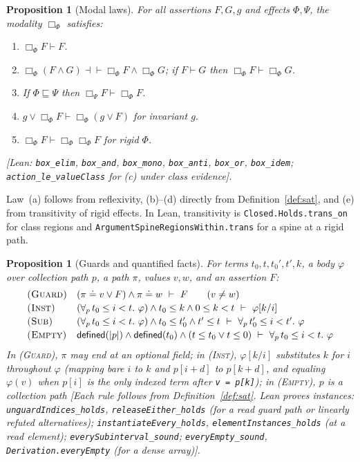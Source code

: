 \documentclass[10pt,a4paper]{article}
\newtheorem{proposition}[theorem]{Proposition}
\theoremstyle{definition}
\theoremstyle{remark}
\newcommand{\bx}[1]{\Box_{#1}}
\newcommand{\kw}[1]{\mathsf{#1}}
\newcommand{\len}[1]{|#1|}
\newcommand{\code}[1]{\texttt{#1}}
\newcommand{\lean}[1]{\texttt{\small #1}}
\newcommand{\status}[1]{\textsf{\small[#1]}}
\begin{document}
\begin{proposition}[Modal laws]\label{prop:laws}
For all assertions $F,G,g$ and effects $\Phi,\Psi$, the modality
$\bx{\Phi}$ satisfies:
\begin{enumerate}[label=(\alph*),itemsep=1pt,topsep=2pt]
\item $\bx{\Phi}F\vdash F$.
\item $\bx{\Phi}(F\wedge G)\dashv\vdash\bx{\Phi}F\wedge\bx{\Phi}G$; if $F\vdash G$ then $\bx{\Phi}F\vdash\bx{\Phi}G$.
\item If $\Phi\sqsubseteq\Psi$ then $\bx{\Psi}F\vdash\bx{\Phi}F$.
\item $g\vee\bx{\Phi}F\vdash\bx{\Phi}(g\vee F)$ for invariant $g$.
\item $\bx{\Phi}F\vdash\bx{\Phi}\bx{\Phi}F$ for rigid $\Phi$.
\end{enumerate}
\status{Lean: \lean{box\_elim}, \lean{box\_and}, \lean{box\_mono}, \lean{box\_anti}, \lean{box\_or}, \lean{box\_idem}; \lean{action\_le\_valueClass} for (c) under class evidence}.
\end{proposition}

\noindent
Law~(a) follows from reflexivity, (b)--(d) directly from
Definition~\ref{def:sat}, and (e) from transitivity of rigid effects. In
Lean, transitivity is \lean{Closed.Holds.trans\_on} for class regions and
\lean{ArgumentSpineRegionsWithin.trans} for a spine at a rigid path.

\begin{proposition}[Guards and quantified facts]\label{prop:every}
For terms $t_0,t,t_0',t',k$, a body $\varphi$ over collection path $p$,
a path $\pi$, values $v,w$, and an assertion $F$:
{\small\begin{displaymath}
\begin{array}{@{}ll@{}}
\textsc{(Guard)} & (\pi\doteq v\vee F)\wedge\pi\doteq w\ \vdash\ F\qquad (v\ne w)\\[2pt]
\textsc{(Inst)} & (\forall_{p}\, t_0\le i<t.\ \varphi)\wedge t_0\le k\wedge 0\le k<t\ \vdash\ \varphi[k/i]\\[2pt]
\textsc{(Sub)} & (\forall_{p}\, t_0\le i<t.\ \varphi)\wedge t_0\le t_0'\wedge t'\le t\ \vdash\ \forall_{p}\, t_0'\le i<t'.\ \varphi\\[2pt]
\textsc{(Empty)} & \kw{defined}(\len p)\wedge\kw{defined}(t_0)\wedge(t\le t_0\vee t\le 0)\ \vdash\ \forall_{p}\, t_0\le i<t.\ \varphi
\end{array}
\end{displaymath}}
In \textsc{(Guard)}, $\pi$ may end at an optional field; in
\textsc{(Inst)}, $\varphi[k/i]$ substitutes $k$ for $i$ throughout
$\varphi$ (mapping bare $i$ to $k$ and $p[i+d]$ to $p[k+d]$, and equaling
$\varphi(v)$ when $p[i]$ is the only indexed term after \code{v = p[k]});
in \textsc{(Empty)}, $p$ is a collection path
\status{Each rule follows from Definition~\ref{def:sat}. Lean proves instances: \lean{unguardIndices\_holds}, \lean{releaseEither\_holds} (for a read guard path or linearly refuted alternatives); \lean{instantiateEvery\_holds}, \lean{elementInstances\_holds} (at a read element); \lean{everySubinterval\_sound}; \lean{everyEmpty\_sound}, \lean{Derivation.everyEmpty} (for a dense array)}.
\end{proposition}
\end{document}
